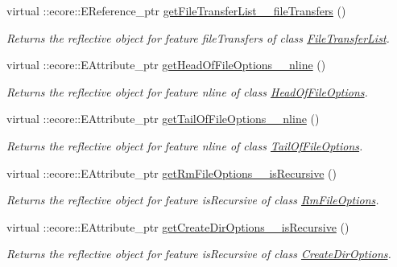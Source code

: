 \begin{DoxyCompactItemize}
virtual ::ecore::EReference\_\-ptr \hyperlink{classFMS__Data_1_1FMS__DataPackage_add3f5fdc93a72d43ea13fb14dd13b64c}{getFileTransferList\_\-\_\-fileTransfers} ()
\begin{DoxyCompactList}\small\item\em Returns the reflective object for feature fileTransfers of class \hyperlink{classFMS__Data_1_1FileTransferList}{FileTransferList}. \item\end{DoxyCompactList}\item 
virtual ::ecore::EAttribute\_\-ptr \hyperlink{classFMS__Data_1_1FMS__DataPackage_aefa44a9d81502dba64227b5e9b551e68}{getHeadOfFileOptions\_\-\_\-nline} ()
\begin{DoxyCompactList}\small\item\em Returns the reflective object for feature nline of class \hyperlink{classFMS__Data_1_1HeadOfFileOptions}{HeadOfFileOptions}. \item\end{DoxyCompactList}\item 
virtual ::ecore::EAttribute\_\-ptr \hyperlink{classFMS__Data_1_1FMS__DataPackage_a368188e18949195a9ebce255702caba3}{getTailOfFileOptions\_\-\_\-nline} ()
\begin{DoxyCompactList}\small\item\em Returns the reflective object for feature nline of class \hyperlink{classFMS__Data_1_1TailOfFileOptions}{TailOfFileOptions}. \item\end{DoxyCompactList}\item 
virtual ::ecore::EAttribute\_\-ptr \hyperlink{classFMS__Data_1_1FMS__DataPackage_a12edcff78cf2cfea281697067f6a9cf4}{getRmFileOptions\_\-\_\-isRecursive} ()
\begin{DoxyCompactList}\small\item\em Returns the reflective object for feature isRecursive of class \hyperlink{classFMS__Data_1_1RmFileOptions}{RmFileOptions}. \item\end{DoxyCompactList}\item 
virtual ::ecore::EAttribute\_\-ptr \hyperlink{classFMS__Data_1_1FMS__DataPackage_ad7385a15fdf685be1869efb1b40d5432}{getCreateDirOptions\_\-\_\-isRecursive} ()
\begin{DoxyCompactList}\small\item\em Returns the reflective object for feature isRecursive of class \hyperlink{classFMS__Data_1_1CreateDirOptions}{CreateDirOptions}. \item\end{DoxyCompactList}\item 

\end{DoxyCompactItemize}
